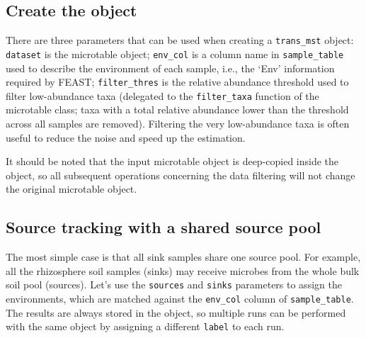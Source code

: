 \documentclass[
]{book}
\newenvironment{Shaded}{\begin{snugshade}}{\end{snugshade}}
\newcommand{\AttributeTok}[1]{\textcolor[rgb]{0.13,0.29,0.53}{#1}}
\newcommand{\DecValTok}[1]{\textcolor[rgb]{0.00,0.00,0.81}{#1}}
\newcommand{\FunctionTok}[1]{\textcolor[rgb]{0.13,0.29,0.53}{\textbf{#1}}}
\newcommand{\NormalTok}[1]{#1}
\newcommand{\OtherTok}[1]{\textcolor[rgb]{0.56,0.35,0.01}{#1}}
\newcommand{\SpecialCharTok}[1]{\textcolor[rgb]{0.81,0.36,0.00}{\textbf{#1}}}
\newcommand{\StringTok}[1]{\textcolor[rgb]{0.31,0.60,0.02}{#1}}
\begin{document}
\subsection{Create the object}\label{create-the-object}

There are three parameters that can be used when creating a \texttt{trans\_mst} object:
\texttt{dataset} is the microtable object;
\texttt{env\_col} is a column name in \texttt{sample\_table} used to describe the environment of each sample,
i.e., the `Env' information required by FEAST;
\texttt{filter\_thres} is the relative abundance threshold used to filter low-abundance taxa
(delegated to the \texttt{filter\_taxa} function of the microtable class;
taxa with a total relative abundance lower than the threshold across all samples are removed).
Filtering the very low-abundance taxa is often useful to reduce the noise and speed up the estimation.

It should be noted that the input microtable object is deep-copied inside the object,
so all subsequent operations concerning the data filtering will not change the original microtable object.

\begin{Shaded}
\end{Shaded}

\subsection{Source tracking with a shared source pool}\label{source-tracking-with-a-shared-source-pool}

The most simple case is that all sink samples share one source pool.
For example, all the rhizosphere soil samples (sinks) may receive microbes from the whole bulk soil pool (sources).
Let's use the \texttt{sources} and \texttt{sinks} parameters to assign the environments,
which are matched against the \texttt{env\_col} column of \texttt{sample\_table}.
The results are always stored in the object, so multiple runs can be performed with the same object by
assigning a different \texttt{label} to each run.
\end{document}
